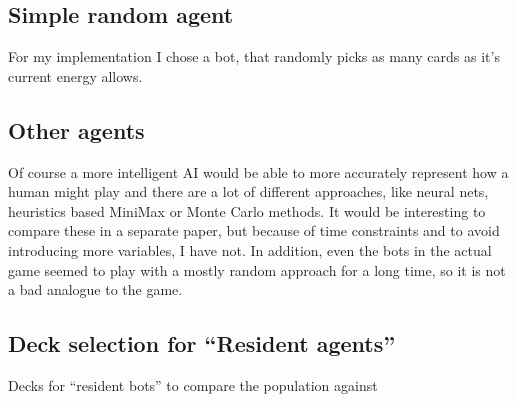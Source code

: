\subsection{Simple random agent}
\label{sec:method:agents:random}
For my implementation I chose a bot, that randomly picks as many cards as it's current energy allows.

\subsection{Other agents}
\label{sec:method:agents:other}
Of course a more intelligent AI would be able to more accurately represent how a human might play and there are a lot of different approaches, like neural nets, heuristics based MiniMax or Monte Carlo methods. It would be interesting to compare these in a separate paper, but because of time constraints and to avoid introducing more variables, I have not. In addition, even the bots in the actual game seemed to play with a mostly random approach for a long time, so it is not a bad analogue to the game.

\subsection{Deck selection for “Resident agents”}
\label{sec:method:agents:resident_decks}
Decks for “resident bots” to compare the population against


